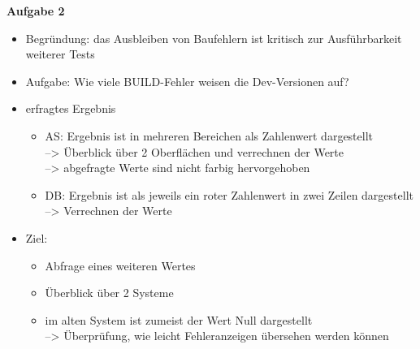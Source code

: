\noindent
\textbf{Aufgabe 2}
\begin{itemize}
    \item Begründung: das Ausbleiben von Baufehlern ist kritisch zur Ausführbarkeit weiterer Tests
    \item Aufgabe: Wie viele BUILD-Fehler weisen die Dev-Versionen auf?
    \item erfragtes Ergebnis
    \begin{itemize}
        \item AS: Ergebnis ist in mehreren Bereichen als Zahlenwert dargestellt\\
                --> Überblick über 2 Oberflächen und verrechnen der Werte\\
                --> abgefragte Werte sind nicht farbig hervorgehoben
        \item DB: Ergebnis ist als jeweils ein roter Zahlenwert in zwei Zeilen dargestellt\\
                --> Verrechnen der Werte
    \end{itemize}
    \item Ziel: 
    \begin{itemize}
        \item Abfrage eines weiteren Wertes
        \item Überblick über 2 Systeme
        \item im alten System ist zumeist der Wert Null dargestellt\\
            --> Überprüfung, wie leicht Fehleranzeigen übersehen werden können
    \end{itemize}
    
\end{itemize}

